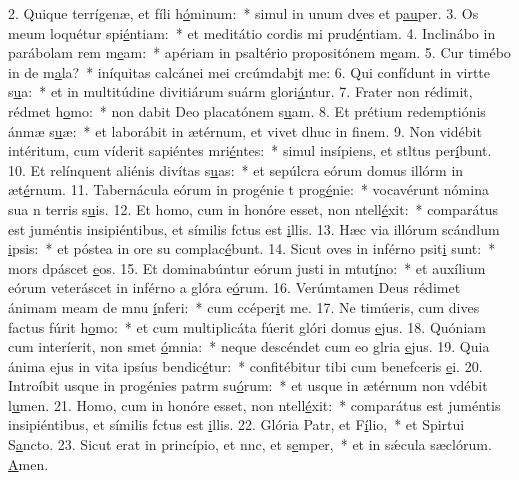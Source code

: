 2. Quique terrígenæ, et fíli h\uline{ó}minum:~* simul in unum dves et p\uline{au}per.
3. Os meum loquétur spi\uline{é}ntiam:~* et meditátio cordis mi prud\uline{é}ntiam.
4. Inclinábo in parábolam rem m\uline{e}am:~* apériam in psaltério propositónem m\uline{e}am.
5. Cur timébo in de m\uline{a}la?~* iníquitas calcánei mei crcúmdab\uline{i}t me:
6. Qui confídunt in virtte s\uline{u}a:~* et in multitúdine divitiárum suárm glori\uline{á}ntur.
7. Frater non rédimit, rédmet h\uline{o}mo:~* non dabit Deo placatónem s\uline{u}am.
8. Et prétium redemptiónis ánmæ s\uline{u}æ:~* et laborábit in ætérnum, et vivet dhuc in f\uline{i}nem.
9. Non vidébit intéritum, cum víderit sapiéntes mri\uline{é}ntes:~* simul insípiens, et stltus per\uline{í}bunt.
10. Et relínquent aliénis divítas s\uline{u}as:~* et sepúlcra eórum domus illórm in æt\uline{é}rnum.
11. Tabernácula eórum in progénie t prog\uline{é}nie:~* vocavérunt nómina sua n terris s\uline{u}is.
12. Et homo, cum in honóre esset, non ntell\uline{é}xit:~* comparátus est juméntis insipiéntibus, et símilis fctus est \uline{i}llis.
13. Hæc via illórum scándlum \uline{i}psis:~* et póstea in ore su complac\uline{é}bunt.
14. Sicut oves in inférno psit\uline{i} sunt:~* mors dpáscet \uline{e}os.
15. Et dominabúntur eórum justi in mtut\uline{í}no:~* et auxílium eórum veteráscet in inférno a glóra e\uline{ó}rum.
16. Verúmtamen Deus rédimet ánimam meam de mnu \uline{í}nferi:~* cum ccéper\uline{i}t me.
17. Ne timúeris, cum dives factus fúrit h\uline{o}mo:~* et cum multiplicáta fúerit glóri domus \uline{e}jus.
18. Quóniam cum interíerit, non smet \uline{ó}mnia:~* neque descéndet cum eo glria \uline{e}jus.
19. Quia ánima ejus in vita ipsíus bendic\uline{é}tur:~* confitébitur tibi cum benefceris \uline{e}i.
20. Introíbit usque in progénies patrm su\uline{ó}rum:~* et usque in ætérnum non vdébit l\uline{u}men.
21. Homo, cum in honóre esset, non ntell\uline{é}xit:~* comparátus est juméntis insipiéntibus, et símilis fctus est \uline{i}llis.
22. Glória Patr, et F\uline{í}lio,~* et Spirtui S\uline{a}ncto.
23. Sicut erat in princípio, et nnc, et s\uline{e}mper,~* et in sǽcula sæclórum. \uline{A}men.
